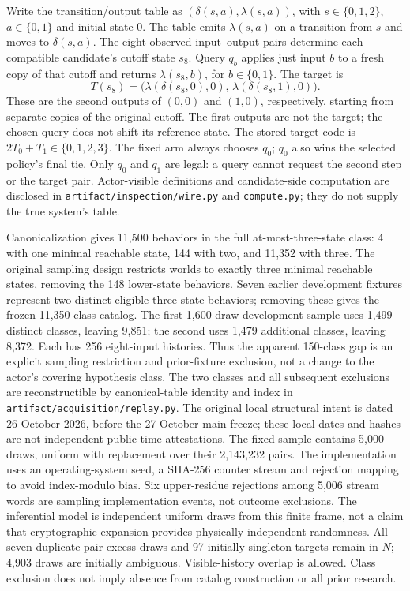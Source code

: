 Write the transition/output table as $(\delta(s,a),\lambda(s,a))$,
with $s\in\{0,1,2\}$, $a\in\{0,1\}$ and initial state 0. The table
emits $\lambda(s,a)$ on a transition from $s$ and moves to
$\delta(s,a)$. The eight observed input--output pairs determine each
compatible candidate's cutoff state $s_8$. Query $q_b$ applies just
input $b$ to a fresh copy of that cutoff and returns
$\lambda(s_8,b)$, for $b\in\{0,1\}$. The target is
\[
T(s_8)=\bigl(\lambda(\delta(s_8,0),0),\,
                 \lambda(\delta(s_8,1),0)\bigr).
\]
These are the second outputs of $(0,0)$ and $(1,0)$, respectively,
starting from separate copies of the original cutoff. The first outputs
are not the target; the chosen query does not shift its reference state.
The stored target code is $2T_0+T_1\in\{0,1,2,3\}$. The fixed arm
always chooses $q_0$; $q_0$ also wins the selected policy's final tie.
Only $q_0$ and $q_1$ are legal: a query cannot request the second step
or the target pair. Actor-visible definitions and candidate-side
computation are disclosed in \texttt{artifact/inspection/wire.py} and
\texttt{compute.py}; they do not supply the true system's table.

Canonicalization gives 11,500 behaviors in the full at-most-three-state
class: 4 with one minimal reachable state, 144 with two, and 11,352 with
three. The original sampling design restricts worlds to exactly three
minimal reachable states, removing the 148 lower-state behaviors. Seven
earlier development fixtures represent two distinct eligible three-state
behaviors; removing these gives the frozen 11,350-class catalog. The first
1,600-draw development sample uses 1,499 distinct classes, leaving 9,851;
the second uses 1,479 additional classes, leaving 8,372. Each has 256
eight-input histories. Thus the apparent 150-class gap is an explicit
sampling restriction and prior-fixture exclusion, not a change to the
actor's covering hypothesis class. The two classes and all subsequent
exclusions are reconstructible by canonical-table identity and index in
\texttt{artifact/acquisition/replay.py}. The original local structural
intent is dated 26 October 2026, before the 27 October main freeze;
these local dates and hashes are not independent public time attestations.
The fixed sample contains 5,000 draws, uniform with replacement over
their 2,143,232 pairs. The implementation uses an operating-system seed,
a SHA-256 counter stream and rejection mapping to avoid index-modulo
bias. Six upper-residue rejections among 5,006 stream words are sampling
implementation events, not outcome exclusions. The inferential model
is independent uniform draws from this finite frame, not a claim that
cryptographic expansion provides physically independent randomness.
All seven duplicate-pair excess draws and 97 initially singleton targets
remain in $N$; 4,903 draws are initially ambiguous. Visible-history
overlap is allowed. Class exclusion does not imply absence from catalog
construction or all prior research.

